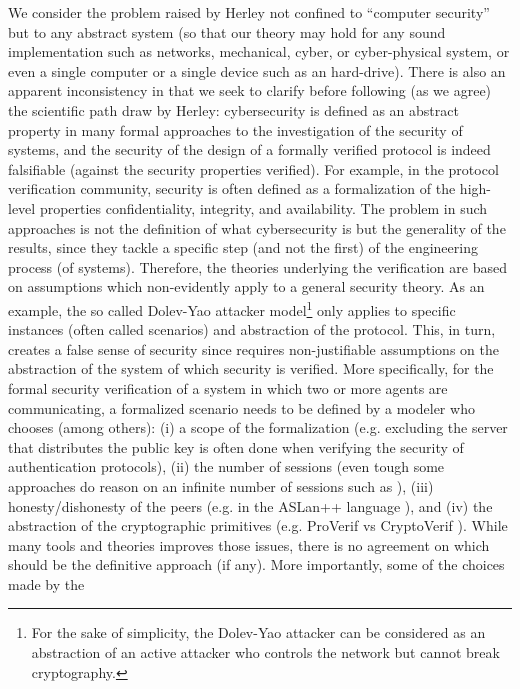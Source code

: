 \documentclass[conference]{IEEEtran}
\begin{document}
We consider the problem raised by Herley not confined to
``computer security'' but to any abstract system (so that our theory may hold
for any sound implementation such as networks, mechanical, cyber, or
cyber-physical system, or even a single computer or a single device such as an
hard-drive).  There is also an apparent inconsistency in
\autocite{Herley2016unfalsifiability} that we seek to clarify before following (as
we agree) the scientific path draw by Herley: cybersecurity is defined as an
abstract property in many formal approaches to the investigation of the
security of systems, and the security of the design of a formally verified
protocol is indeed falsifiable (against the security properties verified).  For
example, in the protocol verification community, security is often defined as a
formalization of the high-level properties confidentiality, integrity, and
availability. The problem in such approaches is not the definition of what
cybersecurity is but the generality of the results, since they tackle a specific
step (and not the first) of the engineering process (of systems).  Therefore,
the theories underlying the verification are based on assumptions which
non-evidently apply to a general security theory.  As an example, the so called
Dolev-Yao attacker model\footnote{For the sake of simplicity, the Dolev-Yao
attacker can be considered as an abstraction of an active attacker who controls
the network but cannot break cryptography.} \autocite{Dolev1983security} only
applies to specific instances (often called scenarios) and abstraction of the
protocol. This, in turn, creates a false sense of security since requires
non-justifiable assumptions on the abstraction of the system of which security
is verified. More specifically, for the formal security verification of a
system in which two or more agents are communicating, a formalized scenario
needs to be defined by a modeler who chooses (among others): (i) a scope of the
formalization (e.g.  excluding the server that distributes the public key is
often done when verifying the security of authentication protocols), (ii) the
number of sessions (even tough some approaches do reason on an infinite number
of sessions such as \autocite{Escobar2007maudenpa}), (iii) honesty/dishonesty of
the peers (e.g.  in the ASLan++ language \autocite{Oheimb2010aslan++}), and (iv)
the abstraction of the cryptographic primitives (e.g.  ProVerif vs CryptoVerif
\autocite{Blanchet2017symbolic}).  While many tools and theories improves those 
issues, there is no agreement on which should be the definitive
approach (if any). More importantly, some of the choices made by the
\end{document}

